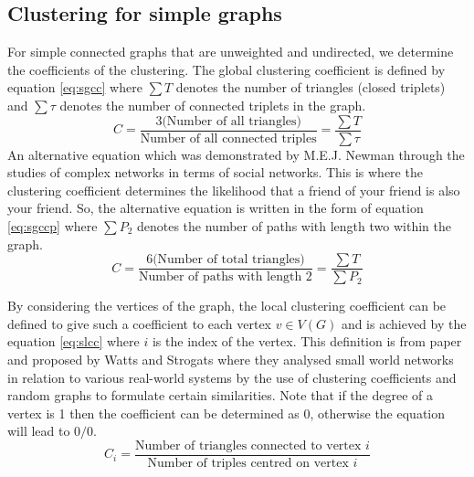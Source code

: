 \subsection{Clustering for simple graphs}
For simple connected graphs that are unweighted and undirected, we determine the coefficients of the clustering. The global clustering coefficient is defined by equation \ref{eq:sgcc} where $\sum{T}$ denotes the number of triangles (closed triplets) and $\sum{\tau}$ denotes the number of connected triplets in the graph.
\begin{equation} \label{eq:sgcc}
C = \frac{3\text{(Number of all triangles)}}{\text{Number of all connected triples}} = \frac{\sum{T}}{\sum{\tau}}
\end{equation}
An alternative equation which was demonstrated by M.E.J. Newman \cite{Newman_2003} through the studies of complex networks in terms of social networks. This is where the clustering coefficient determines the likelihood that a friend of your friend is also your friend. So, the alternative equation is written in the form of equation \ref{eq:sgccp} where $\sum{P_2}$ denotes the number of paths with length two within the graph.
\begin{equation} \label{eq:sgccp}
C = \frac{6\text{(Number of total triangles)}}{\text{Number of paths with length 2}} = \frac{\sum{T}}{\sum{P_2}}
\end{equation}

By considering the vertices of the graph, the local clustering coefficient can be defined to give such a coefficient to each vertex $v\in V(G)$ and is achieved by the equation \ref{eq:slcc} where $i$ is the index of the vertex. This definition is from paper \cite{Newman_2003} and proposed by Watts and Strogats \cite{Watts1998} where they analysed small world networks in relation to various real-world systems by the use of clustering coefficients and random graphs to formulate certain similarities. Note that if the degree of a vertex is 1 then the coefficient can be determined as 0, otherwise the equation will lead to $0/0$.
\begin{equation} \label{eq:slcc}
C_i = \frac{\text{Number of triangles connected to vertex $i$}}{\text{Number of triples centred on vertex $i$}}
\end{equation}


